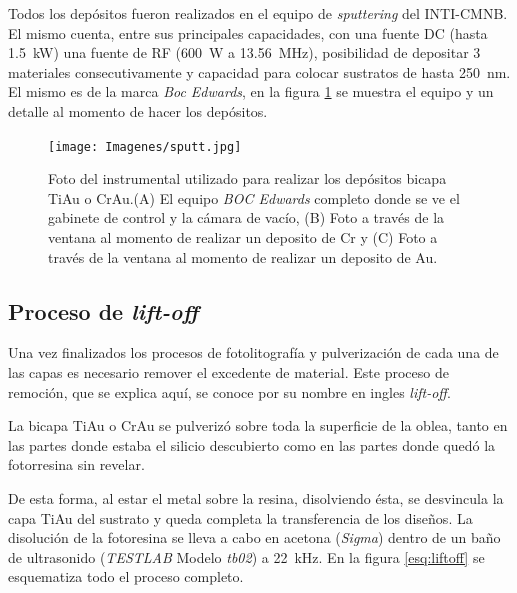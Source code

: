		   	Todos los depósitos fueron realizados en el equipo de \textit{sputtering} del INTI-CMNB. El mismo cuenta, entre sus principales capacidades, con una fuente DC (hasta \SI{1.5}{\kW}) una fuente de RF (\SI{600}{W} a \SI{13.56}{\MHz}), posibilidad de depositar 3 materiales consecutivamente y capacidad para colocar sustratos de hasta \SI{250}{\nm}. El mismo es de la marca \textit{Boc Edwards}, en la figura \ref{fig:sputt} se muestra el equipo y un detalle al momento de hacer los depósitos.


		   		  \begin{figure}[h!]
				  \begin{center}
				  \texttt{[image: Imagenes/sputt.jpg]}
				  \caption[Equipo para depósito de películas delgadas, \textit{sputtering}]{Foto del instrumental utilizado para realizar los depósitos bicapa Ti\textbar Au o Cr\textbar Au.(A) El equipo \textit{BOC Edwards} completo donde se ve el gabinete de control y la cámara de vacío, (B) Foto a través de la ventana al momento de realizar un deposito de Cr y (C) Foto a través de la ventana al momento de realizar un deposito de Au.}
				  \label{fig:sputt}
				  \end{center}
				  \end{figure}

	\vspace*{-1.0cm}\subsection{Proceso de\textit{ lift-off}}

   	     Una vez finalizados los procesos de fotolitografía y pulverización de cada una de las capas es necesario remover el excedente de material. Este proceso de remoción, que se explica aquí, se conoce por su nombre en ingles \textit{lift-off}.

		 La bicapa Ti\textbar Au o Cr\textbar Au se pulverizó sobre toda la superficie de la oblea, tanto en las partes donde estaba el silicio descubierto como en las partes donde quedó la fotorresina sin revelar. 
		
		 De esta forma, al estar el metal sobre la resina, disolviendo ésta, se desvincula la capa Ti\textbar Au del sustrato y queda completa la transferencia de los diseños. 
		 La disolución de la fotoresina se lleva a cabo en acetona (\textit{Sigma}) dentro de un baño de ultrasonido (\textit{TESTLAB} Modelo \textit{tb02}) a \SI{22}{\kHz}. En la figura \ref{esq:liftoff} se esquematiza todo el proceso completo.

